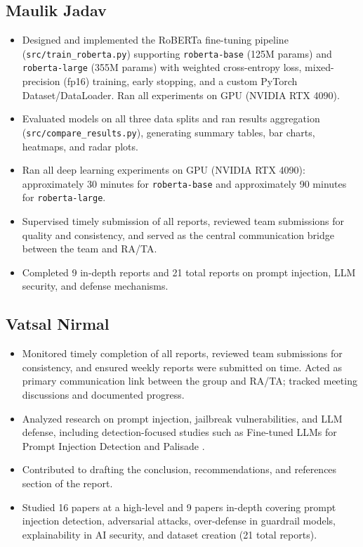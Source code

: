\documentclass[12pt, letterpaper]{article}   %
\begin{document}
\subsection{Maulik Jadav}
\begin{itemize}
    \item Designed and implemented the RoBERTa fine-tuning pipeline (\texttt{src/train\_roberta.py}) supporting \texttt{roberta-base} (125M params) and \texttt{roberta-large} (355M params) with weighted cross-entropy loss, mixed-precision (fp16) training, early stopping, and a custom PyTorch Dataset/DataLoader. Ran all experiments on GPU (NVIDIA RTX 4090).
    \item Evaluated models on all three data splits and ran results aggregation (\texttt{src/compare\_results.py}), generating summary tables, bar charts, heatmaps, and radar plots.
    \item Ran all deep learning experiments on GPU (NVIDIA RTX 4090): approximately 30 minutes for \texttt{roberta-base} and approximately 90 minutes for \texttt{roberta-large}.
    \item Supervised timely submission of all reports, reviewed team submissions for quality and consistency, and served as the central communication bridge between the team and RA/TA.
    \item Completed 9 in-depth reports and 21 total reports on prompt injection, LLM security, and defense mechanisms.
\end{itemize}

\subsection{Vatsal Nirmal}
\begin{itemize}
    \item Monitored timely completion of all reports, reviewed team submissions for consistency, and ensured weekly reports were submitted on time. Acted as primary communication link between the group and RA/TA; tracked meeting discussions and documented progress.
    \item Analyzed research on prompt injection, jailbreak vulnerabilities, and LLM defense, including detection-focused studies such as Fine-tuned LLMs for Prompt Injection Detection \cite{ref37} and Palisade \cite{ref38}.
    \item Contributed to drafting the conclusion, recommendations, and references section of the report.
    \item Studied 16 papers at a high-level and 9 papers in-depth covering prompt injection detection, adversarial attacks, over-defense in guardrail models, explainability in AI security, and dataset creation (21 total reports).
\end{itemize}
\end{document}
